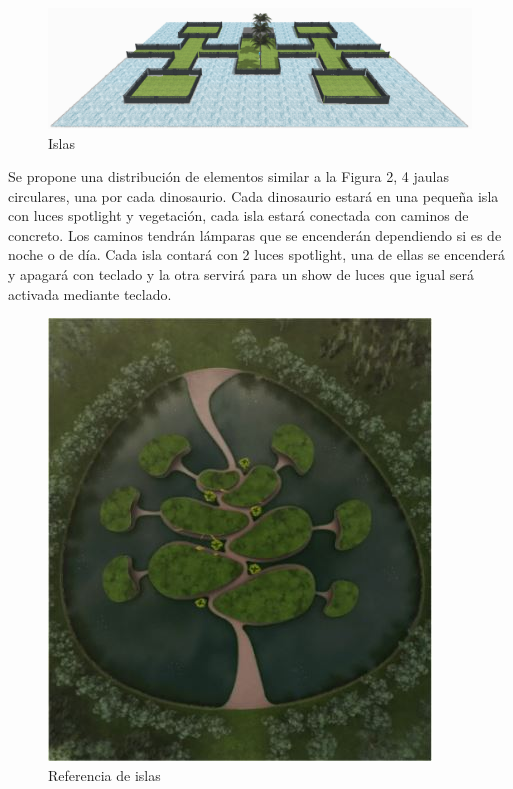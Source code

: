 \documentclass[12pt]{article} %
\begin{document}
	\begin{figure}[h]
		\begin{center}
			\includegraphics[scale=1.65]{images/vista.png}
			\caption{Islas}
		\end{center}  		
	\end{figure}
	
	\setlength{\parindent}{1.0cm}
	Se propone una distribución de elementos similar a la Figura 2, 4 jaulas circulares, una por cada dinosaurio. 
	Cada dinosaurio estará en una pequeña isla con luces spotlight y vegetación, 
	cada isla estará conectada con caminos de concreto. 
	Los caminos tendrán lámparas que se encenderán dependiendo si es de noche o de día. 
	Cada isla contará con 2 luces spotlight, una de ellas se encenderá y apagará con teclado y la otra servirá para 
	un show de luces que igual será activada mediante teclado.
	\setlength{\parindent}{0.0cm}
	
	\begin{figure}[h]
		\begin{center}
			\includegraphics[scale=0.5]{images/Isla.JPG}
		\caption{Referencia de islas}
		\end{center}  		
	\end{figure}
	
\end{document}
